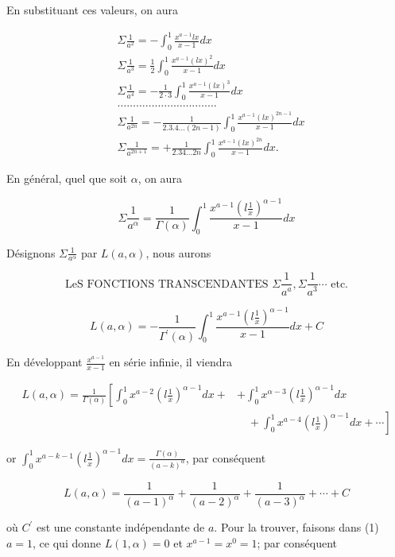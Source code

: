 \documentclass{article}
\begin{document}
En substituant ces valeurs, on aura

\[
\begin{aligned}
& \Sigma \frac{1}{a^{2}}=-\int_{0}^{1} \frac{x^{a-1} l x}{x-1} d x \\
& \Sigma \frac{1}{a^{3}}=\frac{1}{2} \int_{0}^{1} \frac{x^{a-1}(l x)^{2}}{x-1} d x \\
& \Sigma \frac{1}{a^{4}}=-\frac{1}{2 \cdot 3} \int_{0}^{1} \frac{x^{a-1}(l x)^{3}}{x-1} d x \\
& \ldots \ldots \ldots \ldots \ldots \ldots \ldots \ldots . \ldots . \ldots \\
& \Sigma \frac{1}{a^{2 n}}=-\frac{1}{2.3 .4 \ldots(2 n-1)} \int_{0}^{1} \frac{x^{a-1}(l x)^{2 n-1}}{x-1} d x \\
& \Sigma \frac{1}{a^{2 n+1}}=+\frac{1}{2.34 \ldots 2 n} \int_{0}^{1} \frac{x^{a-1}(l x)^{2 n}}{x-1} d x .
\end{aligned}
\]

En général, quel que soit \(\alpha\), on aura

\[
\Sigma \frac{1}{a^{\alpha}}=\frac{1}{\Gamma(\alpha)} \int_{0}^{1} \frac{x^{a-1}\left(l \frac{1}{x}\right)^{\alpha-1}}{x-1} d x
\]

Désignons \(\Sigma \frac{1}{a^{\alpha}}\) par \(L(a, \alpha)\), nous aurons

\[
\text { LeS FONCTIONS TRANSCENDANTES } \Sigma \frac{1}{a^{a}}, \Sigma \frac{1}{a^{3}} \cdots \text { etc. }
\]

\[
L(a, \alpha)=-\frac{1}{\Gamma^{\prime}(\alpha)} \int_{0}^{1} \frac{x^{a-1}\left(l \frac{1}{x}\right)^{\alpha-1}}{x-1} d x+C
\]

En développant \(\frac{x^{a-1}}{x-1}\) en série infinie, il viendra

\[
\begin{aligned}
L(a, \alpha)=\frac{1}{\Gamma(\alpha)}\left[\int_{0}^{1} x^{a-2}\left(l \frac{1}{x}\right)^{\alpha-1} d x+\right. & +\int_{0}^{1} x^{\alpha-3}\left(l \frac{1}{x}\right)^{\alpha-1} d x \\
& \left.\quad+\int_{0}^{1} x^{a-4}\left(l \frac{1}{x}\right)^{\alpha-1} d x+\cdots\right]
\end{aligned}
\]

or \(\int_{0}^{1} x^{a-k-1}\left(l \frac{1}{x}\right)^{\alpha-1} d x=\frac{\Gamma(\alpha)}{(a-k)^{\alpha}}\), par conséquent

\[
L(a, \alpha)=\frac{1}{(a-1)^{\alpha}}+\frac{1}{(a-2)^{\alpha}}+\frac{1}{(a-3)^{\alpha}}+\cdots+C
\]

où \(C^{\prime}\) est une constante indépendante de \(a\). Pour la trouver, faisons dans (1) \(a=1\), ce qui donne \(L(1, \alpha)=0\) et \(x^{a-1}=x^{0}=1\); par conséquent
\end{document}

